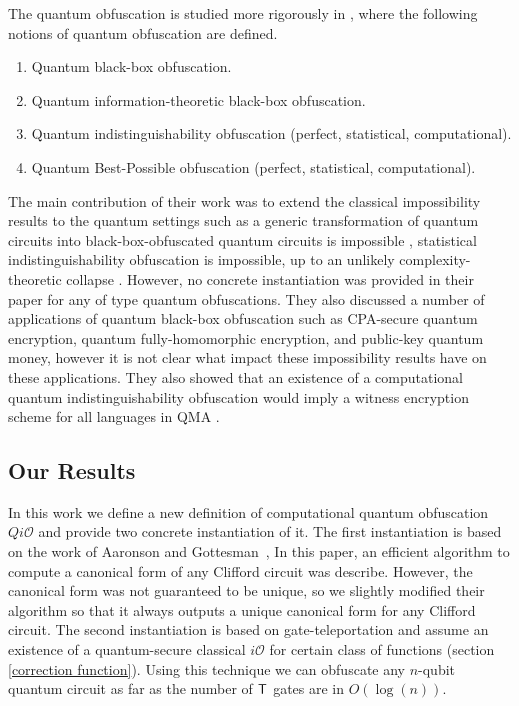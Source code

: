 The quantum obfuscation is studied more rigorously in \cite{AF16a}, where the following notions of quantum obfuscation are defined.
\begin{enumerate}
\item Quantum black-box obfuscation.
\item Quantum information-theoretic black-box obfuscation.
\item Quantum indistinguishability obfuscation (perfect, statistical, computational).
\item Quantum Best-Possible obfuscation (perfect, statistical, computational).
\end{enumerate}

 The main contribution of their work was to extend the classical impossibility results to the quantum settings such as a generic transformation of quantum circuits into black-box-obfuscated quantum circuits is impossible \cite{AF16arxiv},  statistical indistinguishability obfuscation is impossible, up to an unlikely complexity-theoretic collapse \cite{AF16arxiv}. However, no concrete instantiation was provided in their paper for any of type quantum obfuscations. They also discussed a number of applications of quantum black-box obfuscation such as CPA-secure quantum encryption, quantum fully-homomorphic encryption, and public-key quantum money, however it is not clear what impact these impossibility results have on these applications. They also showed that an existence of a computational quantum indistinguishability obfuscation would imply a witness encryption scheme for all languages in QMA \cite{arXiv:1602.01771v1}.


\subsection{Our Results}

 In this work we define a new definition of computational quantum obfuscation $Qi\mathcal{O}$ and provide two concrete instantiation of it. The first instantiation is based on the work of Aaronson and Gottesman~\cite{AG04}, In this paper, an efficient algorithm to compute a canonical form of any Clifford circuit was describe. However, the canonical form was not guaranteed to be unique, so we slightly modified their algorithm so that it always outputs a unique canonical form for any Clifford circuit. The second instantiation is based on gate-teleportation \cite{} and assume an existence of a quantum-secure classical $i\mathcal{O}$ for certain class of functions (section \ref{correction function}). Using this technique we can obfuscate any $n$-qubit quantum circuit as far as the number of ${\sf T}$ gates are in $O(\log(n)).$






